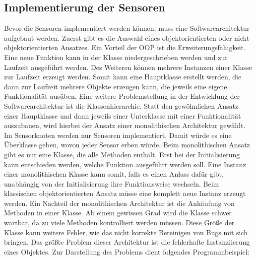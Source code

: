 \subsection{Implementierung der Sensoren}\label{Sensorknoten:Implementierung}
Bevor die Sensoren implementiert werden können, muss eine Softwarearchitektur aufgebaut werden. Zuerst gibt es die Auswahl eines objektorientierten oder nicht objektorientierten Ansatzes.
Ein Vorteil der \ac{OOP} ist die Erweiterungsfähigkeit. Eine neue Funktion kann in der Klasse niedergeschrieben werden und zur Laufzeit ausgeführt werden. Des Weiteren können mehrere Instanzen einer Klasse zur Laufzeit erzeugt werden. Somit kann eine Hauptklasse erstellt werden, die dann zur Laufzeit mehrere Objekte erzeugen kann, die jeweils eine eigene Funktionalität ausüben. Eine weitere Problemstellung in der Entwicklung der Softwarearchitektur ist die Klassenhierarchie. Statt den gewöhnlichen Ansatz einer Hauptklasse und dann jeweils einer Unterklasse mit einer Funktionalität auszubauen, wird hierbei der Ansatz einer monolithischen Architektur gewählt. Im Sensorknoten werden nur Sensoren implementiert. Damit würde es eine Überklasse geben, wovon jeder Sensor erben würde. Beim monolithischen Ansatz gibt es nur eine Klasse, die alle Methoden enthält. Erst bei der Initialisierung kann entschieden werden, welche Funktion ausgeführt werden soll. Eine Instanz einer monolithischen Klasse kann somit, falls es einen Anlass dafür gibt, unabhängig von der Initialisierung ihre Funktionsweise wechseln. Beim klassischen objektorientierten Ansatz müsse eine komplett neue Instanz erzeugt werden. Ein Nachteil der monolithischen Architektur ist die Anhäufung von Methoden in einer Klasse. Ab einem gewissen Grad wird die Klasse schwer wartbar, da zu viele Methoden kontrolliert werden müssen. Diese Größe der Klasse kann weitere Fehler, wie das nicht korrekte Bereinigen von Bugs mit sich bringen. Das größte Problem dieser Architektur ist die fehlerhafte Instanziierung eines Objektes. Zur Darstellung des Problems dient folgendes Programmbeispiel:

